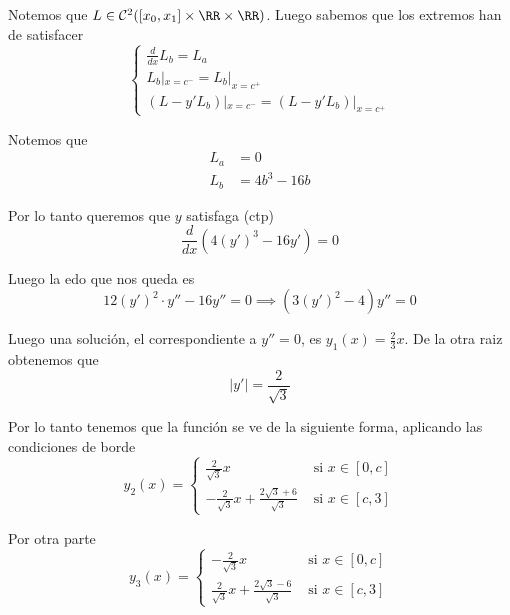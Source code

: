 \documentclass[a4paper,oneside,10.5pt]{USMArt}
\begin{document}
\begin{sol}
  Notemos que $L \in \mathcal{C}^{2}([x_{0}, x_{1}] \times \RR \times \RR)$. Luego sabemos que los extremos han de
  satisfacer
  \begin{equation*}
    \begin{cases}
      \frac{d}{dx} L_{b} = L_{a}\\
      L_{b}|_{x = c^{-}} = L_{b}|_{x = c^{+}}\\
      (L -y' L_{b})|_{x = c^{-}} = (L - y' L_{b})|_{x = c^{+}}
    \end{cases}
  \end{equation*}

  Notemos que
  \begin{align*}
    L_{a} &= 0\\
    L_{b} &= 4b^{3} - 16b
  \end{align*}

  Por lo tanto queremos que $y$ satisfaga (ctp)
  \begin{equation*}
    \frac{d}{dx} (4(y')^{3} - 16y') = 0
  \end{equation*}

  Luego la edo que nos queda es
  \begin{equation*}
    12(y')^{2} \cdot y'' - 16y'' = 0 \implies (3(y')^{2} - 4)y'' = 0
  \end{equation*}

  Luego una solución, el correspondiente a $y'' = 0$, es $y_{1}(x) = \frac{2}{3}x$. De la otra raiz obtenemos que
  \begin{equation*}
    |y'| = \frac{2}{\sqrt{3}}
  \end{equation*}

  Por lo tanto tenemos que la funci\'on se ve de la siguiente forma, aplicando las condiciones de borde
  \begin{equation*}
    y_{2}(x) = \begin{cases}
      \frac{2}{\sqrt3} x & \text{ si } x \in [0, c]\\
      -\frac{2}{\sqrt{3}} x + \frac{2\sqrt{3} + 6}{\sqrt3} & \text{ si } x \in [c, 3]
    \end{cases}
  \end{equation*}

  Por otra parte
  \begin{equation*}
    y_{3}(x) = \begin{cases}
      -\frac{2}{\sqrt3} x & \text{ si } x \in [0, c]\\
      \frac{2}{\sqrt{3}} x + \frac{2 \sqrt3 - 6}{\sqrt3} & \text{ si } x \in [c, 3]
    \end{cases}
  \end{equation*}


\end{sol}
\end{document}
